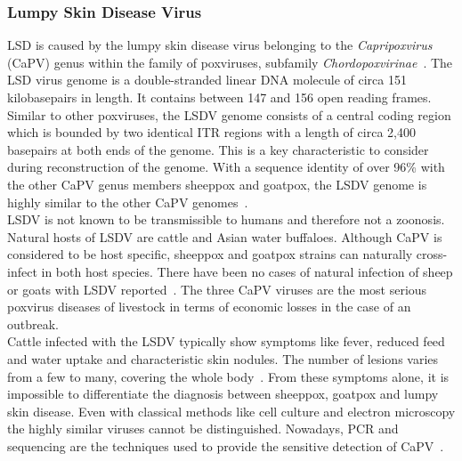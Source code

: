 \subsubsection*{Lumpy Skin Disease Virus}
\ac{LSD} is caused by the lumpy skin disease virus belonging to the \textit{Capripoxvirus} (CaPV) genus within the family of poxviruses, subfamily \textit{Chordopoxvirinae}~\cite{walker2019changes}. The \ac{LSD} virus genome is a double-stranded linear \ac{DNA} molecule of circa 151 kilobasepairs in length. It contains between 147 and 156 open reading frames. Similar to other poxviruses, the \ac{LSDV} genome consists of a central coding region which is bounded by two identical \ac{ITR} regions with a length of circa 2,400 basepairs at both ends of the genome. This is a key characteristic to consider during reconstruction of the genome. With a sequence identity of over 96\% with the other \acs{CaPV} genus members sheeppox and goatpox, the \ac{LSDV} genome is highly similar to the other \acs{CaPV} genomes~\cite{tulman2001genome}. \\
\ac{LSDV} is not known to be transmissible to humans and therefore not a zoonosis. Natural hosts of \ac{LSDV} are cattle and Asian water buffaloes. Although \acs{CaPV} is considered to be host specific, sheeppox and goatpox strains can naturally cross-infect in both host species. There have been no cases of natural infection of sheep or goats with \ac{LSDV} reported~\cite{namazi2021lumpy}. The three \acs{CaPV} viruses are the most serious poxvirus diseases of livestock in terms of economic losses in the case of an outbreak. \\
Cattle infected with the \ac{LSDV} typically show symptoms like fever, reduced feed and water uptake and characteristic skin nodules. The number of lesions varies from a few to many, covering the whole body~\cite{prozesky1982study}. From these symptoms alone, it is impossible to differentiate the diagnosis between sheeppox, goatpox and lumpy skin disease. Even with classical methods like cell culture and electron microscopy the highly similar viruses cannot be distinguished. Nowadays, \ac{PCR} and sequencing are the techniques used to provide the sensitive detection of \acs{CaPV}~\cite{lafar2020capripoxvirus}.

